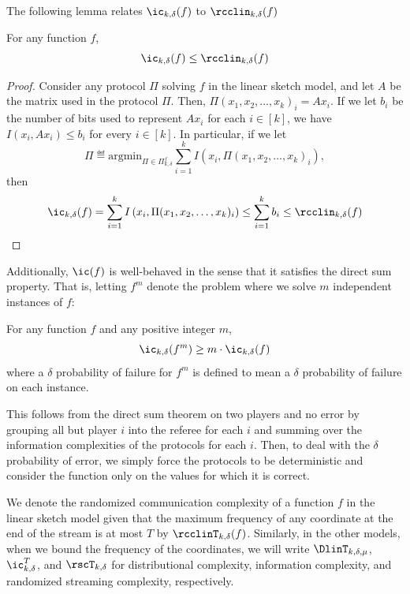 {\color{black}
The following lemma relates $\ic_{k,\delta}(f)$ to $\rcclin_{k,\delta}(f)$
%
\begin{lemma}
For any function $f$,
    $$\ic_{k,\delta}(f) \le \rcclin_{k,\delta}(f)$$
\end{lemma}
\begin{proof}
    Consider any protocol $\Pi$ solving $f$ in the linear sketch model, and let $A$ be the matrix used in the protocol $\Pi$. Then, $\Pi(x_1, x_2, \dots, x_k)_i = Ax_i$. If we let $b_i$ be the number of bits used to represent $Ax_i$ for each $i \in [k]$, we have $I(x_i, Ax_i) \le b_i$ for every $i \in [k]$. In particular, if we let
    $$\Pi \eqdef \text{argmin}_{\Pi \in \Pi^f_{k,\delta}} \sum_{i=1}^k I\left(x_i, \Pi(x_1, x_2, \dots, x_k)_i\right),$$
    then
\begin{equation*}
  \ic_{k,\delta}(f) = \sum_{i=1}^k I\left(x_i, \Pi(x_1, x_2, \dots, x_k)_i\right) \le \sum_{i=1}^k b_i \le \rcclin_{k,\delta}(f) \qedhere
\end{equation*}
%
\end{proof}
}
Additionally, $\ic(f)$ is well-behaved in the sense that it satisfies the direct sum property. That is, letting $f^m$ denote the problem where we solve $m$ independent instances of $f$:

\begin{theorem}
For any function $f$ and any positive integer $m$,
$$\ic_{k,\delta}(f^m) \ge m \cdot \ic_{k,\delta}(f)$$
where a $\delta$ probability of failure for $f^m$ is defined to mean a $\delta$ probability of failure on each instance.
\end{theorem}
This follows from the direct sum theorem on two players and no error by grouping all but player $i$ into the referee for each $i$ and summing over the information complexities of the protocols for each $i$. Then, to deal with the $\delta$ probability of error, we simply force the protocols to be deterministic and consider the function only on the values for which it is correct.

We denote the randomized communication complexity of a function $f$ in the linear sketch model given that the maximum frequency of any coordinate at the end of the stream is at most $T$ by $\rcclinT_{k,\delta}(f)$. Similarly, in the other models, when we bound the frequency of the coordinates, we will write $\DlinT_{k,\delta,\mu}$, $\ic_{k,\delta}^T$, and $\rscT_{k,\delta}$ for distributional complexity, information complexity, and randomized streaming complexity, respectively.   %
%
%

